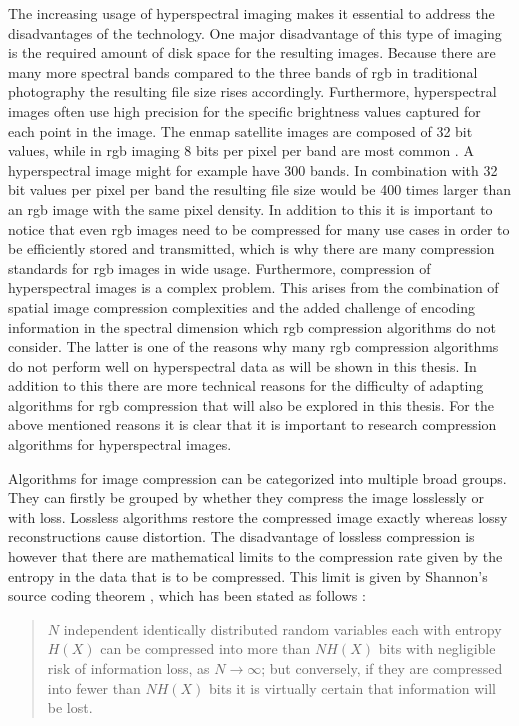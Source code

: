 The increasing usage of hyperspectral imaging makes it essential to address the disadvantages of the technology. One major disadvantage of this type of imaging is the required amount of disk space for the resulting images. Because there are many more spectral bands compared to the three bands of \ac{rgb} in traditional photography the resulting file size rises accordingly. Furthermore, hyperspectral images often use high precision for the specific brightness values captured for each point in the image. The \ac{enmap} satellite images are composed of 32 bit values, while in \ac{rgb} imaging 8 bits per pixel per band are most common \citep{guanter_enmap_2015}. A hyperspectral image might for example have 300 bands. In combination with 32 bit values per pixel per band the resulting file size would be 400 times larger than an \ac{rgb} image with the same pixel density. In addition to this it is important to notice that even \ac{rgb} images need to be compressed for many use cases in order to be efficiently stored and transmitted, which is why there are many compression standards for \ac{rgb} images in wide usage.
Furthermore, compression of hyperspectral images is a complex problem. This arises from the combination of spatial image compression complexities and the added challenge of encoding information in the spectral dimension which \ac{rgb} compression algorithms do not consider. The latter is one of the reasons why many \ac{rgb} compression algorithms do not perform well on hyperspectral data as will be shown in this thesis. In addition to this there are more technical reasons for the difficulty of adapting algorithms for \ac{rgb} compression that will also be explored in this thesis. For the above mentioned reasons it is clear that it is important to research compression algorithms for hyperspectral images.

Algorithms for image compression can be categorized into multiple broad groups. They can firstly be grouped by whether they compress the image losslessly or with loss. Lossless algorithms restore the compressed image exactly whereas lossy reconstructions cause distortion. The disadvantage of lossless compression is however that there are mathematical limits to the compression rate given by the entropy in the data that is to be compressed. This limit is given by Shannon's source coding theorem \citep{shannon_mathematical_1948}, which has been stated as follows \citep{mackay_information_2003}:

\begin{quotation}
$N$ independent identically distributed random variables each with entropy $H(X)$ can be compressed into more than $NH(X)$ bits with negligible risk of information loss, as $N \rightarrow \infty$; but conversely, if they are compressed into fewer than $NH(X)$ bits it is virtually certain that information will be lost.
\end{quotation}

